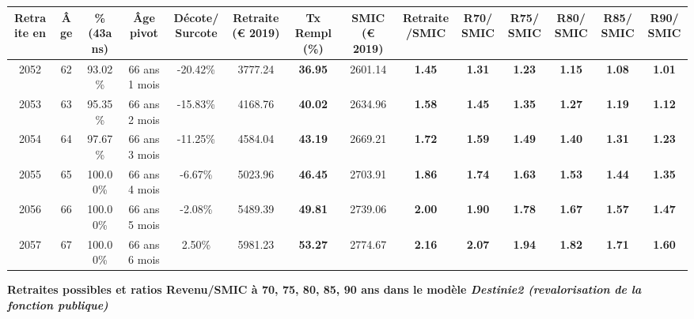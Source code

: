 \begin{adjustbox}{max width=\textwidth} 
\begin{tabular}[htb]{|c|c||c|c|c||c|c||c|c||c|c|c|c|c|} 
\hline 
 Retraite en &  Âge &  \%(43ans) &  Âge pivot &  Décote/Surcote &  Retraite (\euro{} 2019) &  Tx Rempl(\%) &  SMIC (\euro{} 2019) &  Retraite/SMIC &  R70/SMIC &  R75/SMIC &  R80/SMIC &  R85/SMIC &  R90/SMIC \\ 
\hline \hline 
 2052 &  62 &  93.02\% &  66 ans 1 mois &  -20.42\% &  3777.24 &  {\bf 36.95} &  2601.14 &  {\bf 1.45} &  {\bf 1.31} &  {\bf 1.23} &  {\bf 1.15} &  {\bf 1.08} &  {\bf 1.01} \\ 
\hline 
 2053 &  63 &  95.35\% &  66 ans 2 mois &  -15.83\% &  4168.76 &  {\bf 40.02} &  2634.96 &  {\bf 1.58} &  {\bf 1.45} &  {\bf 1.35} &  {\bf 1.27} &  {\bf 1.19} &  {\bf 1.12} \\ 
\hline 
 2054 &  64 &  97.67\% &  66 ans 3 mois &  -11.25\% &  4584.04 &  {\bf 43.19} &  2669.21 &  {\bf 1.72} &  {\bf 1.59} &  {\bf 1.49} &  {\bf 1.40} &  {\bf 1.31} &  {\bf 1.23} \\ 
\hline 
 2055 &  65 &  100.00\% &  66 ans 4 mois &  -6.67\% &  5023.96 &  {\bf 46.45} &  2703.91 &  {\bf 1.86} &  {\bf 1.74} &  {\bf 1.63} &  {\bf 1.53} &  {\bf 1.44} &  {\bf 1.35} \\ 
\hline 
 2056 &  66 &  100.00\% &  66 ans 5 mois &  -2.08\% &  5489.39 &  {\bf 49.81} &  2739.06 &  {\bf 2.00} &  {\bf 1.90} &  {\bf 1.78} &  {\bf 1.67} &  {\bf 1.57} &  {\bf 1.47} \\ 
\hline 
 2057 &  67 &  100.00\% &  66 ans 6 mois &  2.50\% &  5981.23 &  {\bf 53.27} &  2774.67 &  {\bf 2.16} &  {\bf 2.07} &  {\bf 1.94} &  {\bf 1.82} &  {\bf 1.71} &  {\bf 1.60} \\ 
\hline 
\hline 
\end{tabular} 
\end{adjustbox} 
 
 \vspace{0.1cm} 
{\bf \noindent Retraites possibles et ratios Revenu/SMIC à 70, 75, 80, 85, 90 ans dans le modèle \emph{Destinie2 (revalorisation de la fonction publique)}}  
 

